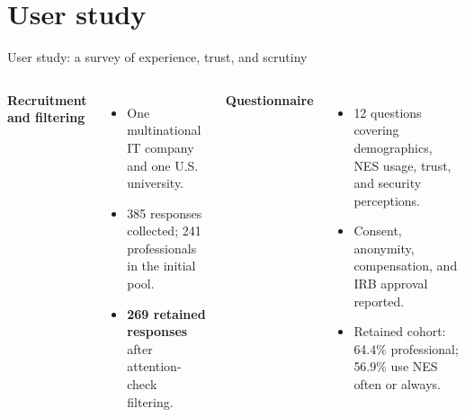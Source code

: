 \section{User study}
\begin{frame}{User study: a survey of experience, trust, and scrutiny}
\begin{columns}[T]
\textbf{Recruitment and filtering}
\begin{itemize}
\item One multinational IT company and one U.S. university.
\item 385 responses collected; 241 professionals in the initial pool.
\item \textbf{269 retained responses} after attention-check filtering.
\end{itemize}
\textbf{Questionnaire}
\begin{itemize}
\item 12 questions covering demographics, NES usage, trust, and security perceptions.
\item Consent, anonymity, compensation, and IRB approval reported.
\item Retained cohort: 64.4\% professional; 56.9\% use NES often or always.
\end{itemize}
\end{columns}
\end{frame}
